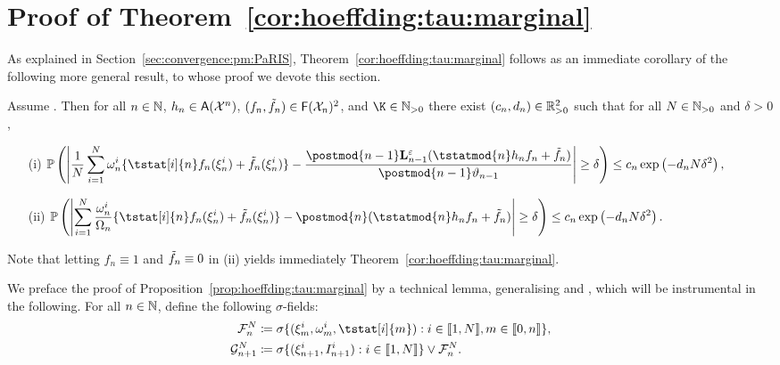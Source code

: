 

\section{Proof of Theorem~\ref{cor:hoeffding:tau:marginal}}
\label{sec:proof:prop:hoeffding:tau:marginal}

As explained in Section~\ref{sec:convergence:pm:PaRIS}, 
Theorem~\ref{cor:hoeffding:tau:marginal} follows as an immediate corollary of the following more general result, to whose proof we devote this section. 

\begin{proposition}
\label{prop:hoeffding:tau:marginal}
Assume . Then for all $n \in \mathbb{N}$, $h_n \in \mathsf{A}(\mathcal{X}^n)$, $(f_n, \tilde{f}_{n}) \in \mathsf{F}(\mathcal{X}_n)^2$, and $\K \in \nsetpos$ there exist $(c_n, d_n) \in \mathbb{R}_{> 0}^2$ such that for all $N \in \mathbb{N}_{> 0}$ and $\delta > 0$,
\begin{itemize}
\item[(i)] 
$ \displaystyle
\pP\left(\left| \frac{1}{\N} \sum_{i = 1}^\N \ewght{n}{i} \{\tstat[i]{n} f_n(\epart{n}{i}) + \ftd{n}(\epart{n}{i})\} - \frac{\postmod{n - 1} \ukmod{n - 1} ( \tstatmod{n} h_n f_n + \tilde{f}_n )}{\postmod{n - 1} \adjfuncforward{n - 1}} \right| \geq \delta \right) \leq c_n \exp \left( - d_n \N \delta^2 \right),
$
\item[(ii)] 
$ \displaystyle
\pP\left(\left| \sum_{i = 1}^\N \frac{\ewght{n}{i}}{\sumwght{n}} \{\tstat[i]{n} f_n(\epart{n}{i}) + \tilde{f}_n(\epart{n}{i})\} - \postmod{n} ( \tstatmod{n} h_n f_n + \tilde{f}_n ) \right| \geq \delta \right) \leq c_n \exp \left( - d_n \N \delta^2 \right).
$
\end{itemize}
\end{proposition}

Note that letting $f_n \equiv 1$ and $\tilde{f}_{n} \equiv 0$ in (ii) yields immediately Theorem~\ref{cor:hoeffding:tau:marginal}. 

We preface the proof of Proposition~\ref{prop:hoeffding:tau:marginal} by a technical lemma, generalising \cite[Lemma~12]{olsson:westerborn:2014b} and \cite[Lemma~2]{gloaguen2018online}, which will be instrumental in the following. For all $n \in \mathbb{N}$, define the following $\sigma$-fields:
\begin{align*}
\calF{n}{\N} &\eqdef \sigma \{ (\epart{m}{i}, \ewght{m}{i}, \tstat[i]{m}) : i \in \intvect{1}{\N}, m \in \intvect{0}{n} \}, \\
\calG{n + 1}{\N} &\eqdef \sigma \{(\epart{n + 1}{i}, \ind{n + 1}{i}) : i \in \intvect{1}{\N} \} \vee \calF{n}{\N}. 
\end{align*}

